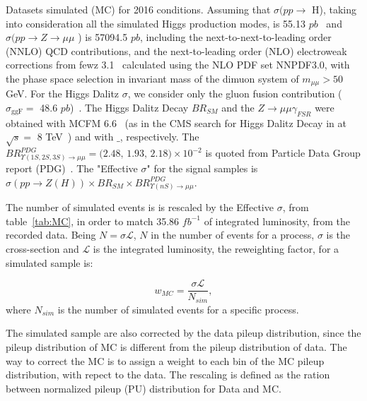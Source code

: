 \begin{table}[htp]
\begin{center}
\caption{Datasets simulated (MC) for 2016 conditions. Assuming that $\sigma (pp\rightarrow$ H), taking into consideration all the simulated Higgs production modes, is 55.13 $pb$~\cite{CERNYellowReportPageAt13TeV} and  $\sigma (pp\rightarrow Z \rightarrow \mu\mu$ ) is 57094.5 $pb$, including the next-to-next-to-leading order
(NNLO) QCD contributions, and the next-to-leading order (NLO) electroweak corrections from fewz 3.1~\cite{FEWZ} calculated using the NLO PDF set NNPDF3.0, with the phase space selection in invariant mass of the dimuon system of $m_{\mu\mu} > 50$ GeV. For the Higgs Dalitz $\sigma$, we consider only the gluon fusion contribution ($\sigma_{\text{ggF}}  = $ 48.6 $pb$)~\cite{CERNYellowReportPageAt13TeV}. The Higgs Dalitz Decay $BR_{SM}$ and the $Z \rightarrow \mu\mu\gamma_{FSR}$ were obtained with MCFM 6.6~\cite{CAMPBELL201010} (as in the CMS search for Higgs Dalitz Decay in at $\sqrt{s} =$ 8 TeV~\cite{dalitz_decay_8_Tev}) and with  $\_$\MCATNLO, respectively. The $BR^{PDG}_{\Upsilon(1S,2S,3S) \rightarrow \mu\mu} = \text{(2.48, 1.93, 2.18)} \times 10^{-2}$ is quoted from Particle Data Group report (PDG)~\cite{pdg_2020}. The "Effective $\sigma$" for the signal samples is $\sigma(pp \rightarrow Z(H)) \times BR_{SM} \times BR^{PDG}_{\Upsilon(nS) \rightarrow \mu\mu}$.}

\label{tab:MC}
\end{center}
\end{table}

The number of simulated events is is rescaled by the Effective $\sigma$, from table~\ref{tab:MC}, in order to match 35.86 $fb^{-1}$ of integrated luminosity, from the recorded data. Being $N = \sigma \mathcal{L}$, $N$ in the number of events for a process, $\sigma$ is the cross-section and $\mathcal{L}$ is the integrated luminosity, the reweighting factor, for a simulated sample is:

\begin{equation}
\label{eqn:mc_weight}
w_{MC} = \frac{\sigma \mathcal{L}}{N_{sim}},
\end{equation}
where $N_{sim}$ is the number of simulated events for a specific process.

The simulated sample are also corrected by the data pileup distribution, since the pileup distribution of MC is different from the pileup distribution of data. The way to correct the MC is to assign a weight to each bin of the MC pileup distribution, with repect to the data. The rescaling is defined as the ration between normalized pileup (PU) distribution for Data and MC.

